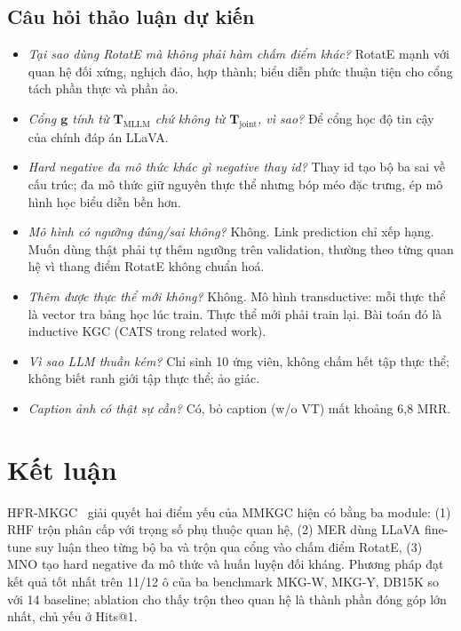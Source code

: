 \documentclass[11pt,a4paper]{article}
\newcommand{\Tj}{\mathbf{T}_{\mathrm{joint}}}
\newcommand{\Tm}{\mathbf{T}_{\mathrm{MLLM}}}
\begin{document}
\subsection{Câu hỏi thảo luận dự kiến}

\begin{itemize}
\item \textit{Tại sao dùng RotatE mà không phải hàm chấm điểm khác?} RotatE mạnh với quan hệ đối xứng, nghịch đảo, hợp thành; biểu diễn phức thuận tiện cho cổng tách phần thực và phần ảo.
\item \textit{Cổng $\mathbf{g}$ tính từ $\Tm$ chứ không từ $\Tj$, vì sao?} Để cổng học độ tin cậy của chính đáp án LLaVA.
\item \textit{Hard negative đa mô thức khác gì negative thay id?} Thay id tạo bộ ba sai về cấu trúc; đa mô thức giữ nguyên thực thể nhưng bóp méo đặc trưng, ép mô hình học biểu diễn bền hơn.
\item \textit{Mô hình có ngưỡng đúng/sai không?} Không. Link prediction chỉ xếp hạng. Muốn dùng thật phải tự thêm ngưỡng trên validation, thường theo từng quan hệ vì thang điểm RotatE không chuẩn hoá.
\item \textit{Thêm được thực thể mới không?} Không. Mô hình transductive: mỗi thực thể là vector tra bảng học lúc train. Thực thể mới phải train lại. Bài toán đó là inductive KGC (CATS trong related work).
\item \textit{Vì sao LLM thuần kém?} Chỉ sinh 10 ứng viên, không chấm hết tập thực thể; không biết ranh giới tập thực thể; ảo giác.
\item \textit{Caption ảnh có thật sự cần?} Có, bỏ caption (w/o VT) mất khoảng 6,8 MRR.
\end{itemize}

\section{Kết luận}

HFR-MKGC~\cite{hfr} giải quyết hai điểm yếu của MMKGC hiện có bằng ba module: (1) RHF trộn phân cấp với trọng số phụ thuộc quan hệ, (2) MER dùng LLaVA fine-tune suy luận theo từng bộ ba và trộn qua cổng vào chấm điểm RotatE, (3) MNO tạo hard negative đa mô thức và huấn luyện đối kháng. Phương pháp đạt kết quả tốt nhất trên 11/12 ô của ba benchmark MKG-W, MKG-Y, DB15K so với 14 baseline; ablation cho thấy trộn theo quan hệ là thành phần đóng góp lớn nhất, chủ yếu ở Hits@1.
\end{document}
